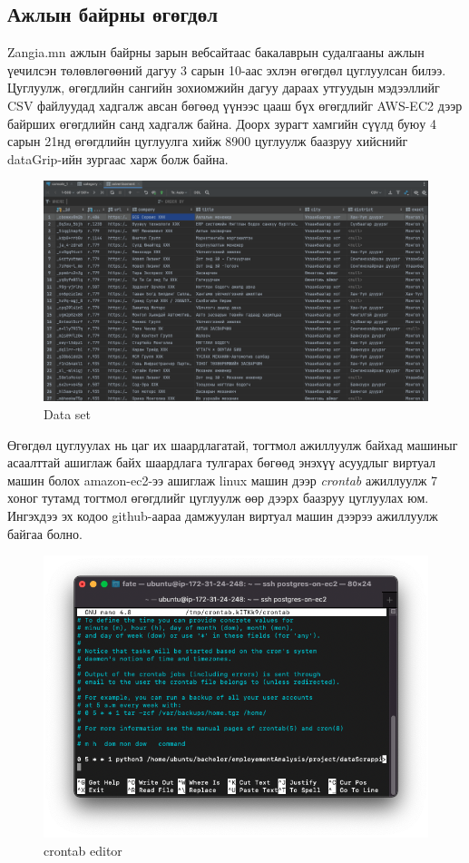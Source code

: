 \subsection{Ажлын байрны өгөгдөл}
Zangia.mn ажлын байрны зарын вебсайтаас бакалаврын судалгааны ажлын үечилсэн төлөвлөгөөний дагуу 3 сарын 10-аас эхлэн өгөгдөл цуглуулсан билээ. Цуглуулж, өгөгдлийн сангийн зохиомжийн дагуу дараах утгуудын мэдээллийг CSV файлуудад хадгалж авсан бөгөөд үүнээс цааш бүх өгөгдлийг AWS-EC2 дээр байрших өгөгдлийн санд хадгалж байна.  
Доорх зурагт хамгийн сүүлд буюу 4 сарын 21нд өгөгдлийн цуглуулга хийж 8900 цуглуулж баазруу хийснийг dataGrip-ийн зургаас харж болж байна. 
\begin{figure}[ht]
  \centering
  \includegraphics[width=\textwidth-4cm]{images/dataSet.png}
  \caption{Data set}\label{fig:dataSet1}
\end{figure}
Өгөгдөл цуглуулах нь цаг их шаардлагатай, тогтмол ажиллуулж байхад машиныг асаалттай ашиглаж байх шаардлага тулгарах бөгөөд энэхүү асуудлыг виртуал машин болох amazon-ec2-ээ ашиглаж linux машин дээр \textit{crontab} ажиллуулж 7 хоног тутамд тогтмол өгөгдлийг цуглуулж өөр дээрх баазруу цуглуулах юм. Ингэхдээ эх кодоо github-аараа дамжуулан виртуал машин дээрээ ажиллуулж байгаа болно. 
\begin{figure}[ht]
  \centering
  \includegraphics[width=\textwidth-4cm]{images/crontab.png}
  \caption{crontab editor}\label{fig:crontab}
\end{figure}
\newpage
